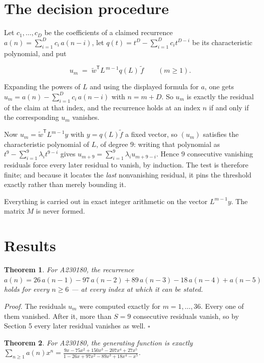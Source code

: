 \documentclass[11pt]{article}
\newtheorem{theorem}{Theorem}
\theoremstyle{definition}
\begin{document}
\section{The decision procedure}

Let $c_1,\dots,c_D$ be the coefficients of a claimed recurrence $a(n) = \sum_{i=1}^{D} c_i\,a(n-i)$, let $q(t) = t^{D} - \sum_{i=1}^{D} c_i t^{D-i}$ be its characteristic polynomial, and put

\[u_m \;=\; \tilde w^{\mathsf T} L^{\,m-1} q(L)\,\tilde f \qquad (m \ge 1).\]

Expanding the powers of $L$ and using the displayed formula for $a$, one gets $u_m = a(n) - \sum_{i=1}^{D} c_i\,a(n-i)$ with $n = m + D$. So $u_m$ is exactly the residual of the claim at that index, and the recurrence holds at an index $n$ if and only if the corresponding $u_m$ vanishes.

Now $u_m = \tilde w^{\mathsf T} L^{m-1} y$ with $y = q(L)\tilde f$ a fixed vector, so $(u_m)$ satisfies the characteristic polynomial of $L$, of degree $9$: writing that polynomial as $t^{9} - \sum_{i=1}^{9} \lambda_i t^{9-i}$ gives $u_{m+9} = \sum_{i=1}^{9} \lambda_i u_{m+9-i}$. Hence $9$ consecutive vanishing residuals force every later residual to vanish, by induction. The test is therefore finite; and because it locates the {\itshape last} nonvanishing residual, it pins the threshold exactly rather than merely bounding it.

Everything is carried out in exact integer arithmetic on the vector $L^{m-1}y$. The matrix $M$ is never formed.

\section{Results}

\begin{theorem} For A230180, the recurrence $a(n) = 26\,a(n-1) - 97\,a(n-2) + 89\,a(n-3) - 18\,a(n-4) + a(n-5)$ holds for every $n \ge 6$ --- at every index at which it can be stated.\end{theorem}

{\itshape Proof.} The residuals $u_m$ were computed exactly for $m = 1,\dots,36$. Every one of them vanished. After it, more than $S = 9$ consecutive residuals vanish, so by Section 5 every later residual vanishes as well. $\square$

\begin{theorem} For A230180, the generating function is exactly $\sum_{n\ge 1} a(n)x^n = \frac{9x - 75x^{2} + 150x^{3} - 207x^{4} + 27x^{5}}{1 - 26x + 97x^{2} - 89x^{3} + 18x^{4} - x^{5}}$.\end{theorem}
\end{document}
